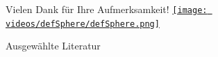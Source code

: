 \documentclass[handout]{beamer}
\begin{document}
  \begin{frame}
    \begin{block}{\huge Vielen Dank für Ihre Aufmerksamkeit! }
      \centering\href{run:videos/defSphere/runVideo.sh}{\texttt{[image: videos/defSphere/defSphere.png]}}
    \end{block}
  \end{frame}

  \begin{frame}
    \begin{block}{Ausgewählte Literatur}
      \footnotesize
      \nocite{hirani}\nocite{marsden}\nocite{jaenich}\nocite{meshCooper}
      
      {}
    \end{block}
  \end{frame}
\end{document}
